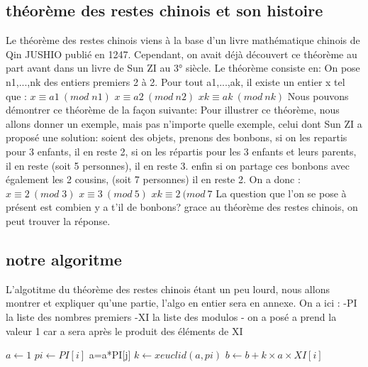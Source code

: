 \documentclass[a4paper, 11pt]{article}
\begin{document}
\subsection{théorème des restes chinois et son histoire}
Le théorème des restes chinois viens à la base d’un livre mathématique chinois de Qin JUSHIO publié en 1247. Cependant, on avait déjà découvert ce théorème au part avant dans un livre de Sun ZI au 3° siècle. Le théorème consiste en:
On pose n1,...,nk des entiers premiers 2 à 2. Pour tout a1,...,ak, il existe un entier x tel que :
\newline
$ x\equiv a1 \: (mod \;  n1)$ 
\newline
$ x\equiv a2 \: (mod \: n2)$
\newline
$ xk \equiv ak \:(mod\: nk)$
\newline
Nous pouvons démontrer ce théorème de la façon suivante:
\newline
\newline
Pour illustrer ce théorème, nous allons donner un exemple, mais pas n'importe quelle exemple, celui dont Sun ZI a proposé une solution:
\newline
soient des objets, prenons des bonbons, si on les repartis pour 3 enfants, il en reste 2, si on les répartis
pour les 3 enfants et leurs parents, il en reste (soit 5 personnes), il en reste 3. enfin si on partage ces bonbons avec également les 2 cousins,
(soit 7 personnes) il en reste 2. On a donc :
\newline 
$ x\equiv 2 \: (mod \;  3)$ 
\newline
$ x\equiv 3 \: (mod \: 5)$
\newline
$ xk \equiv 2 \:(mod\: 7$
\newline
La question que l'on se pose à présent est combien y a t'il de bonbons?
\newline
grace au théorème des restes chinois, on peut trouver la réponse.

\newpage

\subsection{notre algoritme}
L'algotitme du théorème des restes chinois étant un peu lourd, nous allons montrer et expliquer qu'une partie, l'algo en entier sera en annexe.
On a ici :
-PI la liste des nombres premiers
-XI la liste des modulos
- on a posé a prend la valeur 1 car a sera après le produit des éléments de XI 


\begin{algorithm}
    {
        $a \leftarrow 1 $ \;
        $pi \leftarrow PI[i]$ \;
        {
                { a=a*PI[j]}
        $k \leftarrow xeuclid(a,pi) $ \;
        $b \leftarrow b+k\times a\times XI[i] $ \; 
        }
    }
\end{algorithm}
\end{document}
